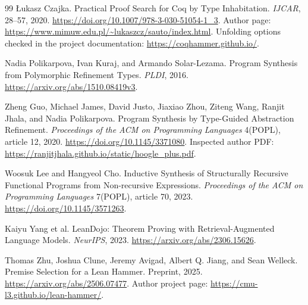 \documentclass[11pt,a4paper]{article}
\theoremstyle{definition}
\theoremstyle{remark}
\begin{document}
\begin{thebibliography}{99}
\L ukasz Czajka. Practical Proof Search for Coq by Type Inhabitation.
\emph{IJCAR}, 28--57, 2020.
\url{https://doi.org/10.1007/978-3-030-51054-1_3}.
Author page: \url{https://www.mimuw.edu.pl/~lukaszcz/sauto/index.html}.
Unfolding options checked in the project documentation:
\url{https://coqhammer.github.io/}.

Nadia Polikarpova, Ivan Kuraj, and Armando Solar-Lezama. Program Synthesis from
Polymorphic Refinement Types. \emph{PLDI}, 2016.
\url{https://arxiv.org/abs/1510.08419v3}.

Zheng Guo, Michael James, David Justo, Jiaxiao Zhou, Ziteng Wang, Ranjit Jhala,
and Nadia Polikarpova. Program Synthesis by Type-Guided Abstraction Refinement.
\emph{Proceedings of the ACM on Programming Languages} 4(POPL), article 12, 2020.
\url{https://doi.org/10.1145/3371080}.
Inspected author PDF: \url{https://ranjitjhala.github.io/static/hoogle_plus.pdf}.

Woosuk Lee and Hangyeol Cho. Inductive Synthesis of Structurally Recursive
Functional Programs from Non-recursive Expressions.
\emph{Proceedings of the ACM on Programming Languages} 7(POPL), article 70, 2023.
\url{https://doi.org/10.1145/3571263}.

Kaiyu Yang et al. LeanDojo: Theorem Proving with Retrieval-Augmented Language
Models. \emph{NeurIPS}, 2023.
\url{https://arxiv.org/abs/2306.15626}.

Thomas Zhu, Joshua Clune, Jeremy Avigad, Albert Q. Jiang, and Sean Welleck.
Premise Selection for a Lean Hammer. Preprint, 2025.
\url{https://arxiv.org/abs/2506.07477}.
Author project page: \url{https://cmu-l3.github.io/lean-hammer/}.
\end{thebibliography}
\end{document}
